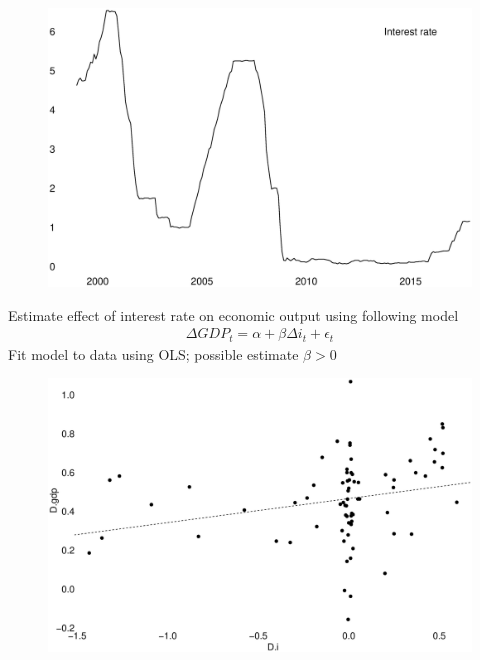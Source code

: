 \documentclass{beamer}
\begin{document}
\begin{frame}
  \begin{figure}
    \includegraphics[scale=.3]{effective_rate.eps}
  \end{figure}
\end{frame}

\begin{frame}
  Estimate effect of interest rate on economic output using following model 
  \begin{align}
    \Delta GDP_t = \alpha + \beta \Delta i_t + \epsilon_t
  \end{align}
  \medskip
  Fit model to data using OLS; possible estimate $\beta > 0$
\end{frame}

\begin{frame}
  \begin{figure}
    \includegraphics[scale=.3]{lm.eps}
  \end{figure}
\end{frame}
\end{document}
